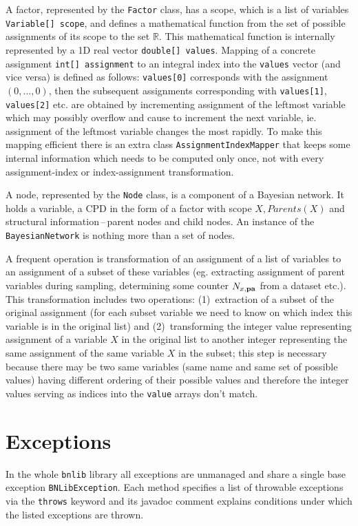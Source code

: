 \documentclass[english,cover]{fitthesis} %
\newcommand{\srccode}[1]{{\tt #1}}         %
\newcommand{\vars}[1]{{\bold{#1}}}         %
\begin{document}
A factor, represented by the \srccode{Factor} class, has a scope, which is a list of variables \srccode{Variable[] scope}, and defines a mathematical function from the set of possible assignments of its scope to the set $\mathbb{R}$. This mathematical function is internally represented by a 1D real vector \srccode{double[] values}. Mapping of a concrete assignment \srccode{int[] assignment} to an integral index into the \srccode{values} vector (and vice versa) is defined as follows: \srccode{values[0]} corresponds with the assignment $(0, \dots, 0)$, then the subsequent assignments corresponding with \srccode{values[1]}, \srccode{values[2]} etc. are obtained by incrementing assignment of the leftmost variable which may possibly overflow and cause to increment the next variable, ie. assignment of the leftmost variable changes the most rapidly. To make this mapping efficient there is an extra class \srccode{AssignmentIndexMapper} that keeps some internal information which needs to be computed only once, not with every assignment-index or index-assignment transformation.

A node, represented by the \srccode{Node} class, is a component of a Bayesian network. It holds a variable, a CPD in the form of a factor with scope $X,Parents(X)$ and structural information\,--\,parent nodes and child nodes. An instance of the \srccode{BayesianNetwork} is nothing more than a set of nodes.

A frequent operation is transformation of an assignment of a list of variables to an assignment of a subset of these variables (eg. extracting assignment of parent variables during sampling, determining some counter $N_{x,\vars{pa}}$ from a dataset etc.). This transformation includes two operations: (1)~extraction of a subset of the original assignment (for each subset variable we need to know on which index this variable is in the original list) and (2)~transforming the integer value representing assignment of a variable $X$ in the original list to another integer representing the same assignment of the same variable $X$ in the subset; this step is necessary because there may be two same variables (same name and same set of possible values) having different ordering of their possible values and therefore the integer values serving as indices into the \srccode{value} arrays don't match. 





\section{Exceptions}
In the whole \srccode{bnlib} library all exceptions are unmanaged and share a single base exception \srccode{BNLibException}. Each method specifies a list of throwable exceptions via the \srccode{throws} keyword and its javadoc comment explains conditions under which the listed exceptions are thrown.
\end{document}
